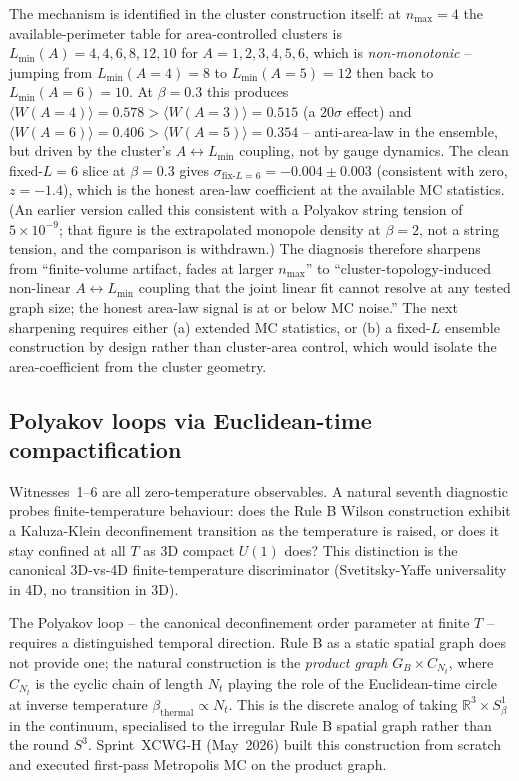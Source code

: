 \documentclass[11pt]{article}
\begin{document}
The mechanism is identified in the cluster construction itself: at $n_\text{max}=4$
the available-perimeter table for area-controlled clusters is
$L_\text{min}(A)=4,4,6,8,12,10$ for $A=1,2,3,4,5,6$, which is
\emph{non-monotonic} -- jumping from $L_\text{min}(A=4)=8$ to $L_\text{min}(A=5)=12$
then back to $L_\text{min}(A=6)=10$. At $\beta=0.3$ this produces
$\langle W(A=4)\rangle=0.578>\langle W(A=3)\rangle=0.515$ (a $20\sigma$ effect)
and $\langle W(A=6)\rangle=0.406>\langle W(A=5)\rangle=0.354$ -- anti-area-law
in the ensemble, but driven by the cluster's $A\leftrightarrow L_\text{min}$
coupling, not by gauge dynamics. The clean fixed-$L=6$ slice at $\beta=0.3$
gives $\sigma_{\text{fix-}L=6}=-0.004\pm 0.003$ (consistent with zero,
$z=-1.4$), which is the honest area-law coefficient at the available MC
statistics.  (An earlier version called this consistent with a Polyakov
string tension of $5\times 10^{-9}$; that figure is the extrapolated
monopole density at $\beta = 2$, not a string tension, and the comparison
is withdrawn.) The diagnosis therefore sharpens
from ``finite-volume artifact, fades at larger $n_\text{max}$'' to
``cluster-topology-induced non-linear $A\leftrightarrow L_\text{min}$ coupling
that the joint linear fit cannot resolve at any tested graph size; the honest
area-law signal is at or below MC noise.'' The next sharpening requires either
(a) extended MC statistics, or (b) a fixed-$L$ ensemble construction by
design rather than cluster-area control, which would isolate the
area-coefficient from the cluster geometry.

\subsection{Polyakov loops via Euclidean-time compactification}
\label{sec:polyakov_loop}

Witnesses~1--6 are all zero-temperature observables. A natural seventh
diagnostic probes finite-temperature behaviour: does the Rule B Wilson
construction exhibit a Kaluza-Klein deconfinement transition as the
temperature is raised, or does it stay confined at all $T$ as 3D compact
$U(1)$ does? This distinction is the canonical 3D-vs-4D finite-temperature
discriminator (Svetitsky-Yaffe universality in 4D, no transition in 3D).

The Polyakov loop -- the canonical deconfinement order parameter at finite
$T$ -- requires a distinguished temporal direction. Rule B as a static
spatial graph does not provide one; the natural construction is the
\emph{product graph} $G_B\times C_{N_t}$, where $C_{N_t}$ is the cyclic
chain of length $N_t$ playing the role of the Euclidean-time circle at
inverse temperature $\beta_\text{thermal}\propto N_t$. This is the discrete
analog of taking $\mathbb{R}^3\times S^1_\beta$ in the continuum,
specialised to the irregular Rule B spatial graph rather than the round
$S^3$. Sprint~XCWG-H (May~2026) built this construction from scratch and
executed first-pass Metropolis MC on the product graph.
\end{document}
